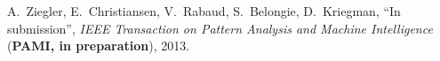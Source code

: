 A.~Ziegler, E.~Christiansen, V.~Rabaud, S.~Belongie, D.~Kriegman, ``In submission'', {\em 
IEEE Transaction on Pattern Analysis and Machine Intelligence} (\textbf{PAMI, in preparation}), 2013.
